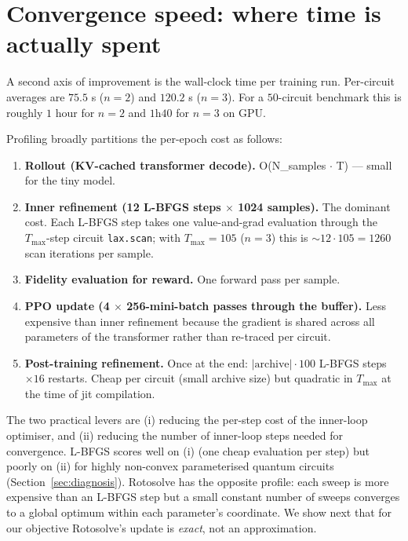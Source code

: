\documentclass[11pt,a4paper]{article}
\begin{document}
\section{Convergence speed: where time is actually spent}

A second axis of improvement is the wall-clock time per training run.
Per-circuit averages are $75.5$ s ($n = 2$) and $120.2$ s ($n = 3$). For
a $50$-circuit benchmark this is roughly $1$ hour for $n = 2$ and
$1$h$40$ for $n = 3$ on GPU.

Profiling broadly partitions the per-epoch cost as follows:
\begin{enumerate}[leftmargin=2em]
\item \textbf{Rollout (KV-cached transformer decode).} O(N\_samples $\cdot$ T) — small for the tiny model.
\item \textbf{Inner refinement (12 L-BFGS steps $\times$ 1024 samples).} The dominant cost. Each L-BFGS step
takes one value-and-grad evaluation through the $T_{\max}$-step circuit
\texttt{lax.scan}; with $T_{\max} = 105$ ($n = 3$) this is $\sim 12 \cdot 105 = 1260$ scan iterations per sample.
\item \textbf{Fidelity evaluation for reward.} One forward pass per sample.
\item \textbf{PPO update (4 $\times$ 256-mini-batch passes through the
buffer).} Less expensive than inner refinement because the gradient is
shared across all parameters of the transformer rather than re-traced
per circuit.
\item \textbf{Post-training refinement.} Once at the end:
$|\text{archive}| \cdot 100$ L-BFGS steps $\times 16$ restarts.
Cheap per circuit (small archive size) but quadratic in
$T_{\max}$ at the time of jit compilation.
\end{enumerate}

The two practical levers are (i) reducing the per-step cost of the
inner-loop optimiser, and (ii) reducing the number of inner-loop steps
needed for convergence. L-BFGS scores well on (i) (one cheap evaluation
per step) but poorly on (ii) for highly non-convex parameterised quantum
circuits (Section~\ref{sec:diagnosis}). Rotosolve has the opposite
profile: each sweep is more expensive than an L-BFGS step but a small
constant number of sweeps converges to a global optimum within each
parameter's coordinate. We show next that for our objective Rotosolve's
update is \emph{exact}, not an approximation.
\end{document}
